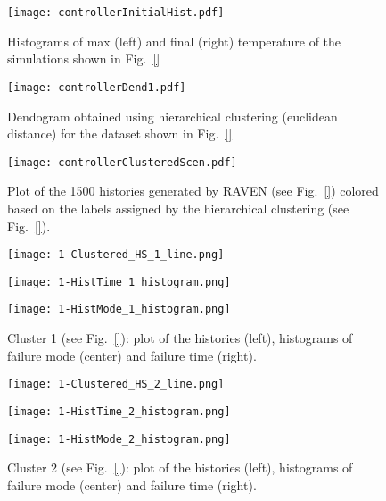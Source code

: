 \begin{figure}
    \centering
    \centerline{\texttt{[image: controllerInitialHist.pdf]}} 
    \caption{Histograms of max (left) and final (right) temperature of the simulations shown in Fig.~\ref{}}
    \label{fig:controllerInitialHist}
\end{figure}

\begin{figure}
    \centering
    \centerline{\texttt{[image: controllerDend1.pdf]}} 
    \caption{Dendogram obtained using hierarchical clustering (euclidean distance) for the dataset 
             shown in Fig.~\ref{}}
    \label{fig:controllerDend1}
\end{figure}

\begin{figure}
    \centering
    \centerline{\texttt{[image: controllerClusteredScen.pdf]}} 
    \caption{Plot of the 1500 histories generated by RAVEN (see Fig.~\ref{}) colored based on the labels assigned 
             by the hierarchical clustering (see Fig.~\ref{}).}
    \label{fig:controllerClusteredScen}
\end{figure}

\begin{figure}
  \centering
  \begin{minipage}{.33\textwidth}
  \centering
  \texttt{[image: 1-Clustered\_HS\_1\_line.png]}
  \end{minipage}\hfill
  \begin{minipage}{.33\textwidth}
  \centering
  \texttt{[image: 1-HistTime\_1\_histogram.png]}
  \end{minipage}\hfill
  \begin{minipage}{.33\textwidth}
  \centering
  \texttt{[image: 1-HistMode\_1\_histogram.png]}
  \end{minipage}
  \caption{Cluster 1 (see Fig.~\ref{}): plot of the histories (left), histograms of failure mode (center) 
           and failure time (right).}
  \label{fig:pump_cluster1}
\end{figure}

\begin{figure}
  \centering
  \begin{minipage}{.33\textwidth}
  \centering
  \texttt{[image: 1-Clustered\_HS\_2\_line.png]}
  \end{minipage}\hfill
  \begin{minipage}{.33\textwidth}
  \centering
  \texttt{[image: 1-HistTime\_2\_histogram.png]}
  \end{minipage}\hfill
  \begin{minipage}{.33\textwidth}
  \centering
  \texttt{[image: 1-HistMode\_2\_histogram.png]}
  \end{minipage}
  \caption{Cluster 2 (see Fig.~\ref{}): plot of the histories (left), histograms of failure mode (center) 
           and failure time (right).}
  \label{fig:pump_cluster2}
\end{figure}

